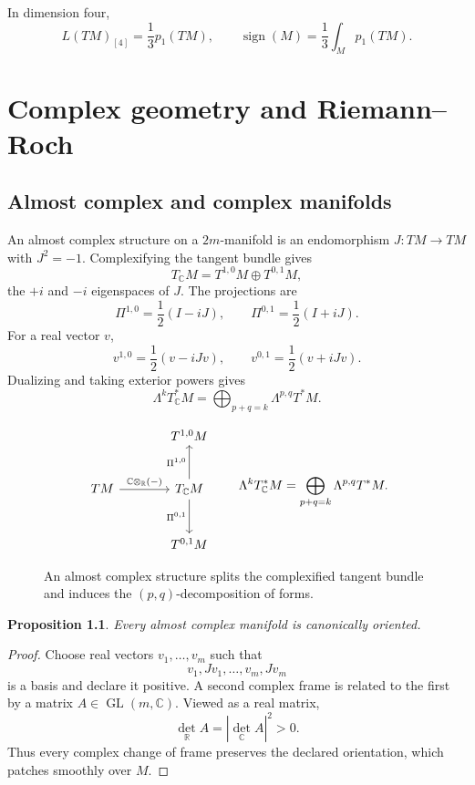 \documentclass[11pt,oneside,reqno]{book}
\newcommand{\C}{\mathbb C}
\theoremstyle{plain}
\newtheorem{proposition}[theorem]{Proposition}
\theoremstyle{definition}
\theoremstyle{remark}
\begin{document}
In dimension four,
\[
 L(TM)_{[4]}=\frac13p_1(TM),
\qquad
 \operatorname{sign}(M)=\frac13\int_Mp_1(TM).
\]


\chapter{Complex geometry and Riemann--Roch}

\section{Almost complex and complex manifolds}

An almost complex structure on a \(2m\)-manifold is an endomorphism
\(J:TM\to TM\) with \(J^2=-1\). Complexifying the tangent bundle gives
\[
 T_\C M=T^{1,0}M\oplus T^{0,1}M,
\]
the \(+i\) and \(-i\) eigenspaces of \(J\). The projections are
\[
 \Pi^{1,0}=\frac12(I-iJ),\qquad
 \Pi^{0,1}=\frac12(I+iJ).
\]
For a real vector \(v\),
\[
 v^{1,0}=\frac12(v-iJv),\qquad
 v^{0,1}=\frac12(v+iJv).
\]
Dualizing and taking exterior powers gives
\[
 \Lambda^kT_\C^*M
 =
 \bigoplus_{p+q=k}\Lambda^{p,q}T^*M.
\]

\begin{figure}[htbp]
\centering
\[
\begin{tikzcd}[column sep=large,row sep=large]
 &T^{1,0}M\\
 TM
 \arrow[r,"\mathbb C\otimes_{\mathbb R}(-)"]
 &T_\mathbb C M
 \arrow[u,"\Pi^{1,0}"]
 \arrow[d,"\Pi^{0,1}"']\\
 &T^{0,1}M
\end{tikzcd}
\qquad
\Lambda^kT_\mathbb C^*M
=\bigoplus_{p+q=k}\Lambda^{p,q}T^*M.
\]
\caption[Almost-complex type decomposition]{An almost complex structure splits the complexified tangent
bundle and induces the \((p,q)\)-decomposition of forms.}
\end{figure}

\begin{proposition}
Every almost complex manifold is canonically oriented.
\end{proposition}

\begin{proof}
Choose real vectors \(v_1,\ldots,v_m\) such that
\[
 v_1,Jv_1,\ldots,v_m,Jv_m
\]
is a basis and declare it positive. A second complex frame is related to
the first by a matrix \(A\in\operatorname{GL}(m,\mathbb C)\). Viewed as a
real matrix,
\[
 \det_{\mathbb R}A=|\det_{\mathbb C}A|^2>0.
\]
Thus every complex change of frame preserves the declared orientation,
which patches smoothly over \(M\).
\end{proof}
\end{document}
